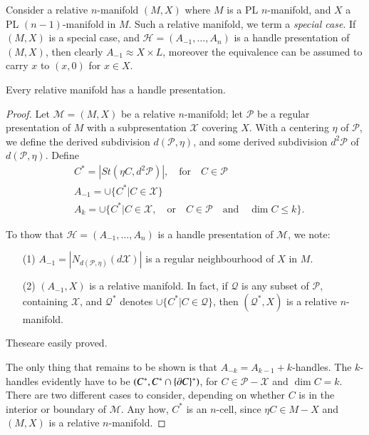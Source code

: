 Consider a relative $n$-manifold  $(M,X)$ where $M$ is a PL $n$-manifold, and $X$ a PL $(n-1)$-manifold in $M$. Such a relative manifold, we term a {\em special case}. If $(M,X)$ is a special case, and $\mathscr{H}=(A_{-1},\ldots,A_{n})$ is a handle presentation of $(M,X)$, then clearly $A_{-1}\approx X\times L$, moreover the equivalence can be assumed to carry $x$ to $(x,0)$ for $x\in X$.

\begin{theorem}\label{chap8-thm8.2.3}
Every relative manifold has a handle presentation. 
\end{theorem}

\begin{proof}
Let $\mathscr{M}=(M,X)$ be a relative $n$-manifold; let $\mathscr{P}$ be a regular presentation of $M$ with a subpresentation $\mathscr{X}$ covering $X$. With a centering $\eta$ of $\mathscr{P}$, we define the derived subdivision $d(\mathscr{P},\eta)$, and some derived subdivision $d^{2}\mathscr{P}$ of $d(\mathscr{P},\eta)$. Define 
\begin{align*}
& C^{\ast}=|St(\eta C, d^{2}\mathscr{P})|,\quad\text{for}\quad C\in \mathscr{P}\\
& A_{-1}=\cup \{C^{\ast}|C\in \mathscr{X}\}\\
& A_{k}=\cup\{C^{*}|C\in \mathscr{X},\quad\text{or}\quad C\in\mathscr{P}\quad\text{and}\quad \dim C\leq k\}.
\end{align*}

To thow that $\mathscr{H}=(A_{-1},\ldots,A_{n})$ is a handle presentation of $\mathscr{M}$, we note:
\begin{itemize}
\item[(1)] $A_{-1}=|N_{d(\mathscr{P},\eta)}(d\mathscr{X})|$ is a regular neighbourhood of $X$ in $M$.

\item[(2)] $(A_{-1},X)$ is a relative manifold. In fact, if $\mathcal{Q}$ is any subset of $\mathscr{P}$, containing $\mathscr{X}$, and $\mathcal{Q}^{\ast}$ denotes $\cup \{C^{*}|C\in \mathcal{Q}\}$, then $(\mathcal{Q}^{*},X)$ is a relative $n$-manifold.
\end{itemize}


These\pageoriginale are easily proved.

The only thing that remains to be shown is that $A_{-k}=A_{k-1}+k$-handles. The $k$-handles evidently have to be $(C^{*},C^{*}\cap \{\partial C\}^{*})$, for $C\in\mathscr{P}-\mathscr{X}$ and $\dim C=k$. There are two different cases to consider, depending on whether $C$ is in the interior or boundary of $\mathscr{M}$. Any how, $C^{*}$ is an $n$-cell, since $\eta C\in M-X$ and $(M,X)$ is a relative $n$-manifold.


\end{proof}
